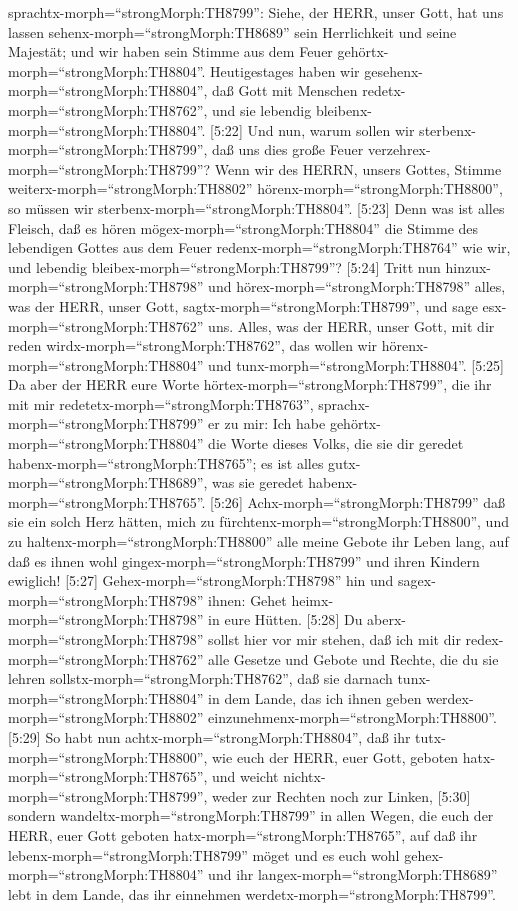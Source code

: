 sprachtx-morph=``strongMorph:TH8799'': Siehe, der HERR, unser Gott, hat
uns lassen sehenx-morph=``strongMorph:TH8689'' sein Herrlichkeit und
seine Majestät; und wir haben sein Stimme aus dem Feuer
gehörtx-morph=``strongMorph:TH8804''. Heutigestages haben wir
gesehenx-morph=``strongMorph:TH8804'', daß Gott mit Menschen
redetx-morph=``strongMorph:TH8762'', und sie lebendig
bleibenx-morph=``strongMorph:TH8804''.  {[}5:22{]} Und nun,
warum sollen wir sterbenx-morph=``strongMorph:TH8799'', daß uns dies
große Feuer verzehrex-morph=``strongMorph:TH8799''? Wenn wir des HERRN,
unsers Gottes, Stimme weiterx-morph=``strongMorph:TH8802''
hörenx-morph=``strongMorph:TH8800'', so müssen wir
sterbenx-morph=``strongMorph:TH8804''.  {[}5:23{]} Denn was
ist alles Fleisch, daß es hören mögex-morph=``strongMorph:TH8804'' die
Stimme des lebendigen Gottes aus dem Feuer
redenx-morph=``strongMorph:TH8764'' wie wir, und lebendig
bleibex-morph=``strongMorph:TH8799''?  {[}5:24{]} Tritt nun
hinzux-morph=``strongMorph:TH8798'' und
hörex-morph=``strongMorph:TH8798'' alles, was der HERR, unser Gott,
sagtx-morph=``strongMorph:TH8799'', und sage
esx-morph=``strongMorph:TH8762'' uns. Alles, was der HERR, unser Gott,
mit dir reden wirdx-morph=``strongMorph:TH8762'', das wollen wir
hörenx-morph=``strongMorph:TH8804'' und
tunx-morph=``strongMorph:TH8804''.  {[}5:25{]} Da aber der
HERR eure Worte hörtex-morph=``strongMorph:TH8799'', die ihr mit mir
redetetx-morph=``strongMorph:TH8763'',
sprachx-morph=``strongMorph:TH8799'' er zu mir: Ich habe
gehörtx-morph=``strongMorph:TH8804'' die Worte dieses Volks, die sie dir
geredet habenx-morph=``strongMorph:TH8765''; es ist alles
gutx-morph=``strongMorph:TH8689'', was sie geredet
habenx-morph=``strongMorph:TH8765''.  {[}5:26{]}
Achx-morph=``strongMorph:TH8799'' daß sie ein solch Herz hätten, mich zu
fürchtenx-morph=``strongMorph:TH8800'', und zu
haltenx-morph=``strongMorph:TH8800'' alle meine Gebote ihr Leben lang,
auf daß es ihnen wohl gingex-morph=``strongMorph:TH8799'' und ihren
Kindern ewiglich!  {[}5:27{]}
Gehex-morph=``strongMorph:TH8798'' hin und
sagex-morph=``strongMorph:TH8798'' ihnen: Gehet
heimx-morph=``strongMorph:TH8798'' in eure Hütten. 
{[}5:28{]} Du aberx-morph=``strongMorph:TH8798'' sollst hier vor mir
stehen, daß ich mit dir redex-morph=``strongMorph:TH8762'' alle Gesetze
und Gebote und Rechte, die du sie lehren
sollstx-morph=``strongMorph:TH8762'', daß sie darnach
tunx-morph=``strongMorph:TH8804'' in dem Lande, das ich ihnen geben
werdex-morph=``strongMorph:TH8802''
einzunehmenx-morph=``strongMorph:TH8800''.  {[}5:29{]} So
habt nun achtx-morph=``strongMorph:TH8804'', daß ihr
tutx-morph=``strongMorph:TH8800'', wie euch der HERR, euer Gott, geboten
hatx-morph=``strongMorph:TH8765'', und weicht
nichtx-morph=``strongMorph:TH8799'', weder zur Rechten noch zur Linken,
 {[}5:30{]} sondern wandeltx-morph=``strongMorph:TH8799''
in allen Wegen, die euch der HERR, euer Gott geboten
hatx-morph=``strongMorph:TH8765'', auf daß ihr
lebenx-morph=``strongMorph:TH8799'' möget und es euch wohl
gehex-morph=``strongMorph:TH8804'' und ihr
langex-morph=``strongMorph:TH8689'' lebt in dem Lande, das ihr einnehmen
werdetx-morph=``strongMorph:TH8799''.

